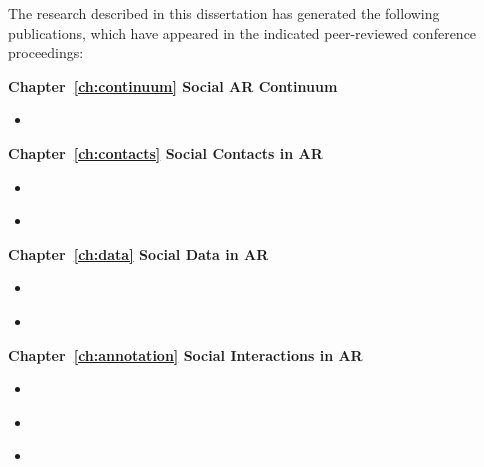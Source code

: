 \begin{preface}
\addchaptertocentry{\prefacename} %

The research described in this dissertation has generated the following publications, which have appeared in the indicated peer-reviewed conference proceedings:

\preto{}

\noindent
\textbf{Chapter~\ref{ch:continuum} Social AR Continuum}
\begin{itemize}
    \item{ }
\end{itemize}

\noindent
\textbf{Chapter~\ref{ch:contacts} Social Contacts in AR}
\begin{itemize}
    \item{ }
    \item{ }
\end{itemize}

\noindent
\textbf{Chapter~\ref{ch:data} Social Data in AR}
\begin{itemize}
    \item{ }
    \item{ }
    
\end{itemize}

\noindent
\textbf{Chapter~\ref{ch:annotation} Social Interactions in AR}
\begin{itemize}
    \item{ }
    \item{ }
    \item{ }
\end{itemize}

\end{preface}